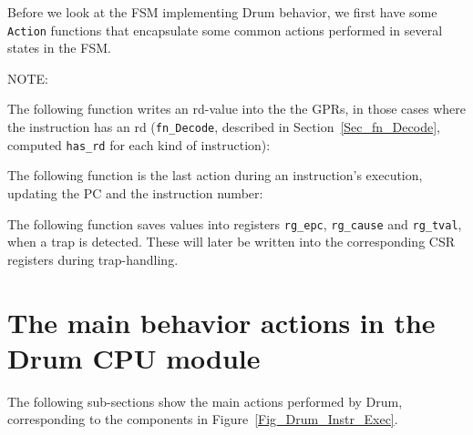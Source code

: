 \label{Sec_Drum_FSM_help_fns}

Before we look at the FSM implementing Drum behavior, we first have
some \verb|Action| functions that encapsulate some common actions
performed in several states in the FSM.

\vspace{2ex}

NOTE:

\vspace{1ex}

The following function writes an rd-value into the the GPRs, in those
cases where the instruction has an rd (\verb|fn_Decode|, described in
Section~\ref{Sec_fn_Decode}, computed \verb|has_rd| for each kind of
instruction):



The following function is the last action during an instruction's
execution, updating the PC and the instruction number:



The following function saves values into registers \verb|rg_epc|,
\verb|rg_cause| and \verb|rg_tval|, when a trap is detected.  These
will later be written into the corresponding CSR registers during
trap-handling.




\section{The main behavior actions in the Drum CPU module}

\label{Sec_Drum_actions}


The following sub-sections show the main actions performed by Drum,
corresponding to the components in Figure~\ref{Fig_Drum_Instr_Exec}.

\vspace{2ex}


